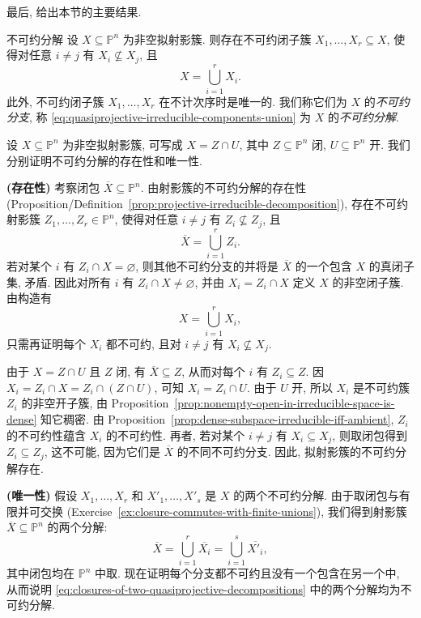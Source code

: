 最后, 给出本节的主要结果.

\begin{BookPropositionDefinition}{不可约分解}\leavevmode\label{prop:quasiprojective-irreducible-decomposition}
设 $X\subseteq\mathbb{P}^{n}$ 为非空拟射影簇. 则存在不可约闭子簇 $X_{1},\ldots,X_{r}\subseteq X$, 使得对任意 $i\ne j$ 有 $X_{i}\not\subseteq X_{j}$, 且
\begin{equation}\label{eq:quasiprojective-irreducible-components-union}
  X=\bigcup_{i=1}^{r}X_{i}.
\end{equation}
此外, 不可约闭子簇 $X_{1},\ldots,X_{r}$ 在不计次序时是唯一的. 我们称它们为 $X$ 的\emph{不可约分支}, 称 \eqref{eq:quasiprojective-irreducible-components-union} 为 $X$ 的\emph{不可约分解}.
\end{BookPropositionDefinition}
\begin{Proof}
设 $X\subseteq\mathbb{P}^{n}$ 为非空拟射影簇, 可写成 $X=Z\cap U$, 其中 $Z\subseteq\mathbb{P}^{n}$ 闭, $U\subseteq\mathbb{P}^{n}$ 开. 我们分别证明不可约分解的存在性和唯一性.

\textbf{(存在性)} 考察闭包 $\overline{X}\subseteq\mathbb{P}^{n}$. 由射影簇的不可约分解的存在性 (Proposition/Definition~\ref{prop:projective-irreducible-decomposition}), 存在不可约射影簇 $Z_{1},\ldots,Z_{r}\in\mathbb{P}^{n}$, 使得对任意 $i\ne j$ 有 $Z_{i}\not\subseteq Z_{j}$, 且
\[
  \overline{X}=\bigcup_{i=1}^{r}Z_{i}.
\]
若对某个 $i$ 有 $Z_{i}\cap X=\varnothing$, 则其他不可约分支的并将是 $\overline{X}$ 的一个包含 $X$ 的真闭子集, 矛盾. 因此对所有 $i$ 有 $Z_{i}\cap X\ne\varnothing$, 并由 $X_{i}=Z_{i}\cap X$ 定义 $X$ 的非空闭子簇. 由构造有
\[
  X=\bigcup_{i=1}^{r}X_{i},
\]
只需再证明每个 $X_{i}$ 都不可约, 且对 $i\ne j$ 有 $X_{i}\not\subseteq X_{j}$.

由于 $X=Z\cap U$ 且 $Z$ 闭, 有 $\overline{X}\subseteq Z$, 从而对每个 $i$ 有 $Z_{i}\subseteq Z$. 因 $X_{i}=Z_{i}\cap X=Z_{i}\cap(Z\cap U)$, 可知 $X_{i}=Z_{i}\cap U$. 由于 $U$ 开, 所以 $X_{i}$ 是不可约簇 $Z_{i}$ 的非空开子簇, 由 Proposition~\ref{prop:nonempty-open-in-irreducible-space-is-dense} 知它稠密. 由 Proposition~\ref{prop:dense-subspace-irreducible-iff-ambient}, $Z_{i}$ 的不可约性蕴含 $X_{i}$ 的不可约性. 再者, 若对某个 $i\ne j$ 有 $X_{i}\subseteq X_{j}$, 则取闭包得到 $Z_{i}\subseteq Z_{j}$, 这不可能, 因为它们是 $\overline{X}$ 的不同不可约分支. 因此, 拟射影簇的不可约分解存在.

\textbf{(唯一性)} 假设 $X_{1},\ldots,X_{r}$ 和 $X'_{1},\ldots,X'_{s}$ 是 $X$ 的两个不可约分解. 由于取闭包与有限并可交换 (Exercise~\ref{ex:closure-commutes-with-finite-unions}), 我们得到射影簇 $\overline{X}\subseteq\mathbb{P}^{n}$ 的两个分解:
\begin{equation}\label{eq:closures-of-two-quasiprojective-decompositions}
  \overline{X}=\bigcup_{i=1}^{r}\overline{X_{i}}
  =\bigcup_{i=1}^{s}\overline{X'_{i}},
\end{equation}
其中闭包均在 $\mathbb{P}^{n}$ 中取. 现在证明每个分支都不可约且没有一个包含在另一个中, 从而说明 \eqref{eq:closures-of-two-quasiprojective-decompositions} 中的两个分解均为不可约分解.


\end{Proof}
